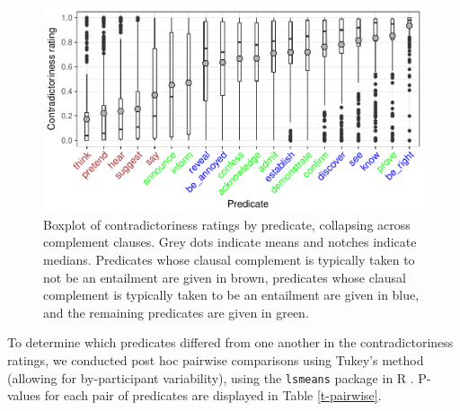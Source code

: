 \documentclass[11pt,fleqn]{article}
\newcommand{\6}{\mbox{$[\hspace*{-.6mm}[$}}
\newcommand{\9}{\mbox{$]\hspace*{-.6mm}]$}}
\begin{document}
\begin{figure}[h!]
\centering

\includegraphics[width=.8\paperwidth]{../results/2-veridicality2/graphs/boxplot-veridicality}

\caption{Boxplot of contradictoriness ratings by predicate, collapsing across complement clauses. Grey dots indicate means and notches indicate medians. Predicates whose clausal complement is typically taken to not be an entailment are given in brown, predicates whose clausal complement is typically taken to be an entailment are given in blue, and the remaining predicates are given in green.}
\label{f-veridicality-predicate}
\end{figure}

To determine which predicates differed from one another in the contradictoriness ratings, we conducted post hoc pairwise comparisons using Tukey's method (allowing for by-participant variability), using the \verb|lsmeans| package \citep{tukey} in R \citep{r}. P-values for each pair of predicates are displayed in Table \ref{t-pairwise}. 
\end{document}
